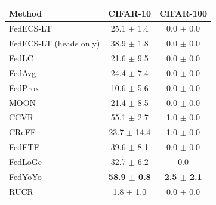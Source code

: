 \begin{tabular}{lcc}
\toprule
Method & CIFAR-10 & CIFAR-100\\
\midrule
FedECS-LT & 25.1 $\pm$ 1.4 & 0.0 $\pm$ 0.0\\
FedECS-LT (heads only) & 38.9 $\pm$ 1.8 & 0.0 $\pm$ 0.0\\
FedLC & 21.6 $\pm$ 9.5 & 0.0 $\pm$ 0.0\\
FedAvg & 24.4 $\pm$ 7.4 & 0.0 $\pm$ 0.0\\
FedProx & 10.6 $\pm$ 5.6 & 0.0 $\pm$ 0.0\\
MOON & 21.4 $\pm$ 8.5 & 0.0 $\pm$ 0.0\\
CCVR & 55.1 $\pm$ 2.7 & 1.0 $\pm$ 0.0\\
CReFF & 23.7 $\pm$ 14.4 & 1.0 $\pm$ 0.0\\
FedETF & 39.6 $\pm$ 8.1 & 0.0 $\pm$ 0.0\\
FedLoGe & 32.7 $\pm$ 6.2 & 0.0\\
FedYoYo & \textbf{58.9 $\pm$ 0.8} & \textbf{2.5 $\pm$ 2.1}\\
RUCR & 1.8 $\pm$ 1.0 & 0.0 $\pm$ 0.0\\
\bottomrule
\end{tabular}
